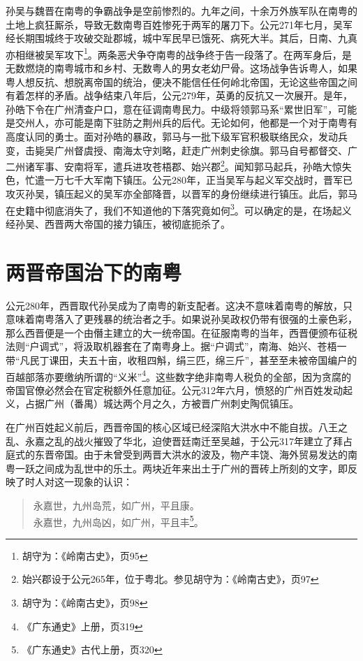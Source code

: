 孙吴与魏晋在南粤的争霸战争是空前惨烈的。九年之间，十余万外族军队在南粤的土地上疯狂厮杀，导致无数南粤百姓惨死于两军的屠刀下。公元271年七月，吴军经长期围城终于攻破交趾郡城，城中军民早已饿死、病死大半。其后，日南、九真亦相继被吴军攻下\footnote{胡守为：《岭南古史》，页95}。两条恶犬争夺南粤的战争终于告一段落了。在两军身后，是无数燃烧的南粤城市和乡村、无数粤人的男女老幼尸骨。这场战争告诉粤人，如果粤人想反抗、想脱离帝国的统治，便决不能信任任何岭北帝国，无论这些帝国之间有着怎样的矛盾。战争结束八年后，公元279年，英勇的反抗又一次展开。是年，孙皓下令在广州清查户口，意在征调南粤民力。中级将领郭马系“累世旧军”，可能是交州人，亦可能是南下驻防之荆州兵的后代。无论如何，他都是一个对于南粤有高度认同的勇士。面对孙皓的暴政，郭马与一批下级军官积极联络民众，发动兵变，击毙吴广州督虞授、南海太守刘略，赶走广州刺史徐旗。郭马自号都督交、广二州诸军事、安南将军，遣兵进攻苍梧郡、始兴郡\footnote{始兴郡设于公元265年，位于粤北。参见胡守为：《岭南古史》，页97}。闻知郭马起兵，孙皓大惊失色，忙遣一万七千大军南下镇压。公元280年，正当吴军与起义军交战时，晋军已攻灭孙吴，镇压起义的吴军亦全部降晋，以晋军的身份继续进行镇压。此后，郭马在史籍中彻底消失了，我们不知道他的下落究竟如何\footnote{胡守为：《岭南古史》，页98}。可以确定的是，在场起义经孙吴、西晋两大帝国的接力镇压，被彻底扼杀了。

\section{两晋帝国治下的南粤}

\indent 公元280年，西晋取代孙吴成为了南粤的新支配者。这决不意味着南粤的解放，只意味着南粤落入了更残暴的统治者之手。如果说孙吴政权仍带有很强的土豪色彩，那么西晋便是一个由僭主建立的大一统帝国。在征服南粤的当年，西晋便颁布征税法则“户调式”，将汲取机器套在了南粤身上。据“户调式”，南海、始兴、苍梧一带“凡民丁课田，夫五十亩，收租四斛，绢三匹，绵三斤”，甚至至未被帝国编户的百越部落亦要缴纳所谓的“义米”\footnote{《广东通史》上册，页319}。这些数字绝非南粤人税负的全部，因为贪腐的帝国官僚必然会在官定税额外任意加征。公元312年六月，愤怒的广州百姓发动起义，占据广州（番禺）城达两个月之久，方被晋广州刺史陶侃镇压。

在广州百姓起义前后，西晋帝国的核心区域已经深陷大洪水中不能自拔。八王之乱、永嘉之乱的战火摧毁了华北，迫使晋廷南迁至吴越，于公元317年建立了拜占庭式的东晋帝国。由于未曾受到两晋大洪水的波及，物产丰饶、海外贸易发达的南粤一跃之间成为乱世中的乐土。两块近年来出土于广州的晋砖上所刻的文字，即反映了时人对这一现象的认识：

\begin{quote}
	永嘉世，九州岛荒，如广州，平且康。\\
	永嘉世，九州岛凶，如广州，平且丰\footnote{《广东通史》古代上册，页320}。
\end{quote}

